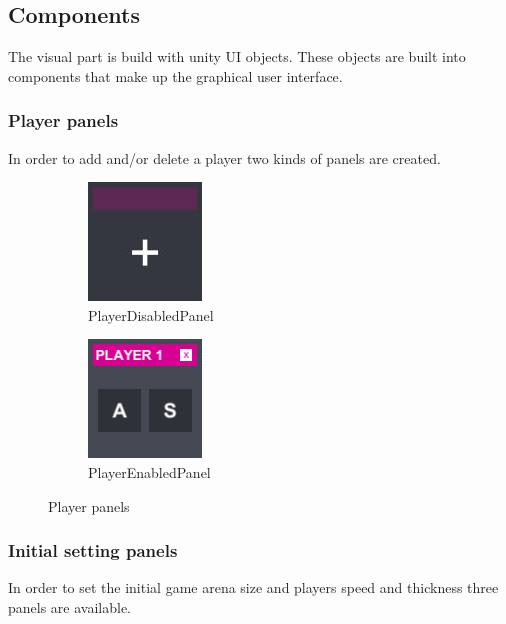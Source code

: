 \subsection{Components}\label{gui-components}
\noindent The visual part is build with unity UI objects. These objects are built into components that make up the graphical user interface.\\

\subsubsection{Player panels}\label{gui-playerpanels}
\noindent In order to add and/or delete a player two kinds of panels are created.

\begin{figure}[!h]\label{gui-colors}\centering
	\captionsetup{justification=centering}
	\begin{subfigure}{0.184\textwidth}
		\includegraphics{gui-imgs/playerdisabledpanel}
		\caption*{PlayerDisabledPanel}
	\end{subfigure}
	\begin{subfigure}{0.184\textwidth}
		\includegraphics{gui-imgs/playerenabledpanel}
		\caption*{PlayerEnabledPanel}
	\end{subfigure}
	\caption{Player panels}
\end{figure}

\subsubsection{Initial setting panels}\label{gui-initialsettingpanels}
\noindent In order to set the initial game arena size and players speed and thickness three panels are available.

